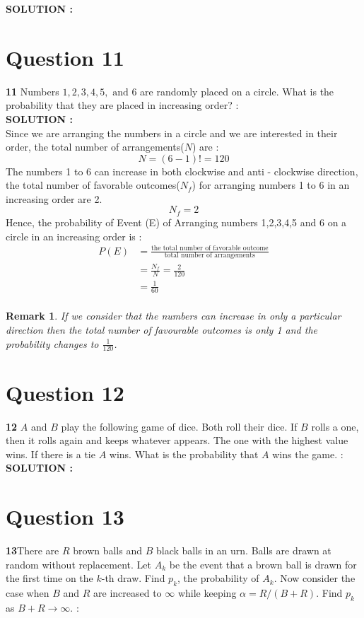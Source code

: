 \documentclass{article}
\newtheorem*{remark}{Remark}
\begin{document}
\hspace{1em} \large{\textbf{SOLUTION :}} \\

\section{Question 11}
\label{Q11}
\textbf{11} Numbers $1, 2, 3, 4, 5, \text{ and } 6$ are randomly placed on a circle. What is the probability that they are placed in increasing order?  : \\

\hspace{1em} \large{\textbf{SOLUTION :}} \\
Since we are arranging the numbers in a circle and we are interested in their order, the total number of arrangements($N$) are :
$$ N = (6-1)! = 120$$
The numbers 1 to 6 can increase in both clockwise and anti - clockwise direction, the total number of favorable outcomes($N_f$) for arranging numbers 1 to 6 in an increasing order are 2.
$$ N_f  = 2 $$
Hence, the probability of Event (E) of Arranging numbers 1,2,3,4,5 and 6 on a circle in an increasing order is :
\begin{align*}
	P(E) &= \frac{\text{the total number of favorable outcome}}{\text{total number of arrangements}} \\
	&= \frac{N_f}{N} = \frac{2}{120} \\
	&= \frac{1}{60} \\
\end{align*}
\begin{remark}
If we consider that the numbers can increase in only a particular direction then the total number of favourable outcomes is only 1 and the probability changes to $\frac{1}{120}$.
\end{remark}
\section{Question 12}
\label{Q12}
\textbf{12} $A$ and $B$ play the following game of dice. Both roll their dice. If $B$ rolls a one, then it rolls again and keeps whatever appears. The one with the highest value wins. If there is a tie $A$ wins. What is the probability that $A$ wins the game. : \\

\hspace{1em} \large{\textbf{SOLUTION :}} \\

\section{Question 13}
\label{Q13}
\textbf{13}There are $R$ brown balls and $B$ black balls in an urn. Balls are drawn at random without replacement. Let $A_k$ be the event that a brown ball is drawn for the first time on the $k$-th draw. Find $p_k$, the probability of $A_k$. Now consider the case when $B$ and $R$ are increased to $\infty$ while keeping $\alpha = R/(B + R).$ Find $p_k$ as $B + R \rightarrow \infty$. : \\
\end{document}

